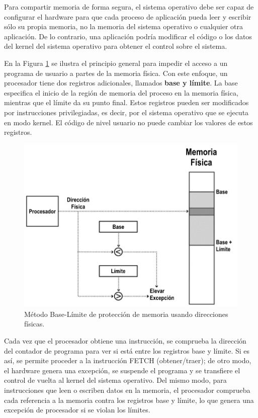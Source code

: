 \documentclass[10pt]{book}
\begin{document}
Para compartir memoria de forma segura, el sistema operativo debe ser capaz de configurar el hardware para que cada proceso de aplicación pueda leer y escribir sólo su propia memoria, no la memoria del sistema operativo o cualquier otra aplicación. De lo contrario, una aplicación podría modificar el código o los datos del kernel del sistema operativo para obtener el control sobre el sistema.

En la Figura \ref{fig0203} se ilustra el principio general para impedir el acceso a un programa de usuario a partes de la memoria física. 
Con este enfoque, un procesador tiene dos registros adicionales, llamados \textbf{base y límite}. La base especifica el inicio de la región de memoria del proceso en la memoria física, mientras que el límite da su punto final. Estos registros pueden ser modificados por instrucciones privilegiadas, es decir, por el sistema operativo que se ejecuta en modo kernel. El código de nivel usuario no puede cambiar los valores de estos registros.

\begin{figure}[tbhp]
\centerline{\includegraphics[scale=0.55]{img/fig0203}}
\caption{Método Base-Límite de protección de memoria usando direcciones físicas.}
\label{fig0203}
\end{figure}

Cada vez que el procesador obtiene una instrucción, se comprueba la dirección del contador de programa para ver si está entre los registros base y límite. Si es así, se permite proceder a la instrucción FETCH (obtener/traer); de otro modo, el hardware genera una excepción, se suspende el programa y se transfiere el control de vuelta al kernel del sistema operativo. Del mismo modo, para instrucciones que leen o escriben datos en la memoria, el procesador comprueba cada referencia a la memoria contra los registros base y límite, lo que genera una excepción de procesador si se violan los límites.
\end{document}
